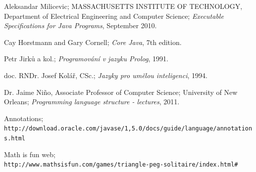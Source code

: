 \documentclass[11pt,twoside,a4paper]{book}
\begin{document}

\begin{thebibliography}{1}

Aleksandar Milicevic; MASSACHUSETTS INSTITUTE OF TECHNOLOGY, Department of
Electrical Engineering and Computer Science; \textit{Executable Specifications
for Java Programs}, September 2010.

Cay Horstmann and Gary Cornell; \textit{Core Java}, 7th edition.

Petr Jirků a kol.; \textit{Programování v jazyku Prolog}, 1991.

doc. RNDr. Josef Kolář, CSc.; \textit{Jazyky pro umělou inteligenci}, 1994.

Dr. Jaime Niño, Associate Professor of Computer Science; University of New
Orleans; \textit{Programming language structure - lectures}, 2011.

Annotations;\\
\verb|http://download.oracle.com/javase/1,5.0/docs/guide/language/annotations.html|

Math
is fun
web;\\\verb|http://www.mathsisfun.com/games/triangle-peg-solitaire/index.html#|

\end{thebibliography}

%




%
{
\def\CS{$\cal C\kern-0.1667em\lower.5ex\hbox{$\cal S$}\kern-0.075em $}

}
\end{document}
